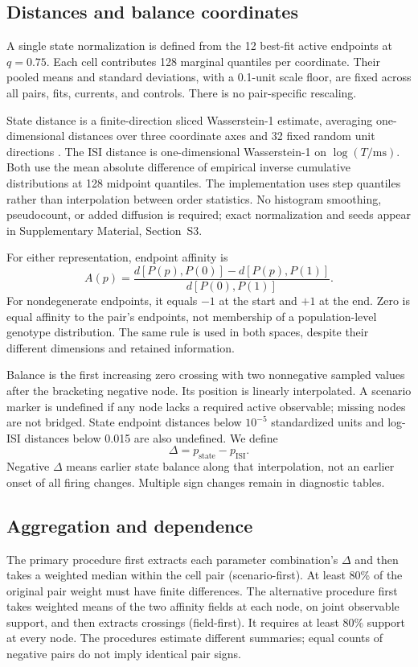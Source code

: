 \documentclass[utf8]{FrontiersinHarvard}
\newcommand{\sref}[1]{Supplementary Material, Section~#1}
\begin{document}
\subsection{Distances and balance coordinates}\label{sec:distances}
A single state normalization is defined from the 12 best-fit active endpoints at $q=0.75$. Each cell contributes 128 marginal quantiles per coordinate. Their pooled means and standard deviations, with a 0.1-unit scale floor, are fixed across all pairs, fits, currents, and controls. There is no pair-specific rescaling.

State distance is a finite-direction sliced Wasserstein-1 estimate, averaging one-dimensional distances over three coordinate axes and 32 fixed random unit directions \citep{bonneel2015}. The ISI distance is one-dimensional Wasserstein-1 on $\log(T/\mathrm{ms})$. Both use the mean absolute difference of empirical inverse cumulative distributions at 128 midpoint quantiles. The implementation uses step quantiles rather than interpolation between order statistics. No histogram smoothing, pseudocount, or added diffusion is required; exact normalization and seeds appear in \sref{S3}.

For either representation, endpoint affinity is
\begin{equation}
A(p)=\frac{d[P(p),P(0)]-d[P(p),P(1)]}{d[P(0),P(1)]}.\label{eq:affinity}
\end{equation}
For nondegenerate endpoints, it equals $-1$ at the start and $+1$ at the end. Zero is equal affinity to the pair's endpoints, not membership of a population-level genotype distribution. The same rule is used in both spaces, despite their different dimensions and retained information.

Balance is the first increasing zero crossing with two nonnegative sampled values after the bracketing negative node. Its position is linearly interpolated. A scenario marker is undefined if any node lacks a required active observable; missing nodes are not bridged. State endpoint distances below $10^{-5}$ standardized units and log-ISI distances below 0.015 are also undefined. We define
\begin{equation}
\Delta=p_{\mathrm{state}}-p_{\mathrm{ISI}}.\label{eq:delta}
\end{equation}
Negative $\Delta$ means earlier state balance along that interpolation, not an earlier onset of all firing changes. Multiple sign changes remain in diagnostic tables.

\subsection{Aggregation and dependence}\label{sec:aggregation}
The primary procedure first extracts each parameter combination's $\Delta$ and then takes a weighted median within the cell pair (scenario-first). At least 80\% of the original pair weight must have finite differences. The alternative procedure first takes weighted means of the two affinity fields at each node, on joint observable support, and then extracts crossings (field-first). It requires at least 80\% support at every node. The procedures estimate different summaries; equal counts of negative pairs do not imply identical pair signs.
\end{document}
